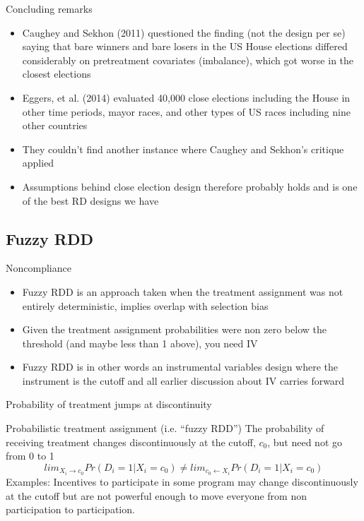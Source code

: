 \documentclass{beamer}
\begin{document}
\begin{frame}{Concluding remarks}

\begin{itemize}
\item Caughey and Sekhon (2011) questioned the finding (not the design per se) saying that bare winners and bare losers in the US House elections differed considerably on pretreatment covariates (imbalance), which got worse in the closest elections
\item Eggers, et al. (2014) evaluated 40,000 close elections including the House in other time periods, mayor races, and other types of US races including nine other countries
\item They couldn't find another instance where Caughey and Sekhon's critique applied
\item Assumptions behind close election design therefore probably holds and is one of the best RD designs we have
\end{itemize}

\end{frame}


\subsection{Fuzzy RDD}


\begin{frame}{Noncompliance}

\begin{itemize}
		\item Fuzzy RDD is an approach taken when the treatment assignment was not entirely deterministic, implies overlap with selection bias
		\item Given the treatment assignment probabilities were non zero below the threshold (and maybe less than 1 above), you need IV
		\item Fuzzy RDD is in other words an instrumental variables design where the instrument is the cutoff and all earlier discussion about IV carries forward
\end{itemize}

\end{frame}

\begin{frame}{Probability of treatment jumps at discontinuity}
	
		\begin{block}{Probabilistic treatment assignment (i.e. ``fuzzy RDD'')}
		The probability of receiving treatment changes discontinuously at the cutoff, $c_0$, but need not go from 0 to 1$$lim_{X_i\rightarrow{c_0}}Pr(D_i=1|X_i=c_0) \neq lim_{c_0 \leftarrow X_i} Pr(D_i=1 | X_i=c_0)$$Examples: Incentives to participate in some program may change discontinuously at the cutoff but are not powerful enough to move everyone from non participation to participation.  
		\end{block}
\end{frame}
\end{document}

